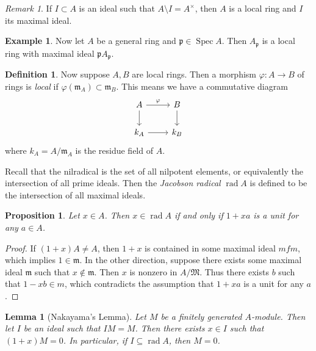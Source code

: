 \documentclass[leqno, openany]{memoir}
\newtheorem{prop}[thm]{Proposition}
\newtheorem{lem}[thm]{Lemma}
\theoremstyle{definition}
\newtheorem{defn}[thm]{Definition}
\newtheorem{exm}[thm]{Example}
\theoremstyle{remark}
\newtheorem{rmk}[thm]{Remark}
\theoremstyle{plain}
\theoremstyle{definition}
\theoremstyle{remark}
\newcommand{\mf}[1]{\mathfrak{#1}}
\DeclareMathOperator{\spec}{Spec}
\begin{document}
\begin{rmk} If $I \subset A$ is an ideal such that $A \setminus I =
A^{\times}$, then $A$ is a local ring and $I$ its maximal ideal.  \end{rmk}

\begin{exm} Now let $A$ be a general ring and $\mf{p} \in \spec A$. Then
$A_{\mf{p}}$ is a local ring with maximal ideal $\mf{p} A_{\mf{p}}$.  \end{exm}

\begin{defn} Now suppose $A,B$ are local rings. Then a morphism $\varphi:A \to
    B$ of rings is \textit{local} if $\varphi(\mf{m}_A) \subset \mf{m}_B$. This
    means we have a commutative diagram \begin{equation} \begin{tikzcd} A
        \arrow{r}{\varphi} \arrow{d} & B \arrow{d} \\ k_A \arrow{r} & k_B
    \end{tikzcd} \end{equation} where $k_A = A/ \mf{m}_A$ is the residue field
of $A$.  \end{defn}

Recall that the nilradical is the set of all nilpotent elements, or
equivalently the intersection of all prime ideals. Then the \textit{Jacobson
radical} $\operatorname{rad} A$ is defined to be the intersection of all
maximal ideals.

\begin{prop} Let $x \in A$. Then $x \in \operatorname{rad} A$ if and only if
$1+xa$ is a unit for any $a \in A$.  \end{prop}

\begin{proof} If $(1+x)A \neq A$, then $1+x$ is contained in some maximal ideal
    $mf{m}$, which implies $1 \in \mf{m}$. In the other direction, suppose
    there exists some maximal ideal $\mf{m}$ such that $x \notin \mathfrak{m}$.
    Then $x$ is nonzero in $A/ \mathfrak{M}$. Thus there exists $b$ such that
    $1-xb \in m$, which contradicts the assumption that $1+xa$ is a unit for
    any $a$.  \end{proof}

\begin{lem}[Nakayama's Lemma] Let $M$ be a finitely generated $A$-module. Then
    let $I$ be an ideal such that $IM = M$. Then there exists $x \in I$ such
    that $(1+x) M = 0$. In particular, if $I \subseteq \operatorname{rad} A$,
    then $M = 0$.  \end{lem}
\end{document}
